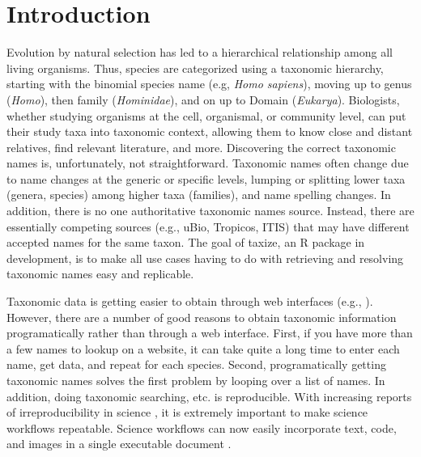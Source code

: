 \documentclass[10pt]{article}\usepackage{graphicx, color}
\begin{document}
\section*{Introduction}
Evolution by natural selection has led to a hierarchical relationship among all living organisms.  Thus, species are categorized using a taxonomic hierarchy, starting with the binomial species name (e.g, \emph{Homo sapiens}), moving up to genus (\emph{Homo}), then family (\emph{Hominidae}), and on up to Domain (\emph{Eukarya}). Biologists, whether studying organisms at the cell, organismal, or community level, can put their study taxa into taxonomic context, allowing them to know close and distant relatives, find relevant literature, and more. Discovering the correct taxonomic names is, unfortunately, not straightforward. Taxonomic names often change due to name changes at the generic or specific levels, lumping or splitting lower taxa (genera, species) among higher taxa (families), and name spelling changes. In addition, there is no one authoritative taxonomic names source. Instead, there are essentially competing sources (e.g., uBio, Tropicos, ITIS) that may have different accepted names for the same taxon. The goal of taxize, an R package in development, is to make all use cases having to do with retrieving and resolving taxonomic names easy and replicable. 

Taxonomic data is getting easier to obtain through web interfaces (e.g., \cite{eol}). However, there are a number of good reasons to obtain taxonomic information programatically rather than through a web interface. First, if you have more than a few names to lookup on a website, it can take quite a long time to enter each name, get data, and repeat for each species. Second, programatically getting taxonomic names solves the first problem by looping over a list of names. In addition, doing taxonomic searching, etc. is reproducible. With increasing reports of irreproducibility in science \cite{stodden2010,zimmer2012}, it is extremely important to make science workflows repeatable. Science workflows can now easily incorporate text, code, and images in a single executable document \cite{yihui2013}. 
\end{document}
